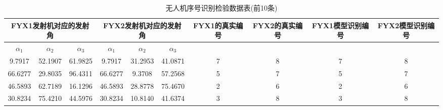 \documentclass[withoutpreface,bwprint]{cumcmthesis}
\begin{document}
	\begin{table}[htbp!]
		\footnotesize
		\caption{无人机序号识别检验数据表(前10条)}
		\centering
		\tabcolsep=0.1cm
		\begin{tabular}{@{}cccccccccc@{}}
			\toprule
			\multicolumn{3}{c}{\textbf{FYX1发射机对应的发射角}}                                                           & \multicolumn{3}{c}{\textbf{FYX2发射机对应的发射角}}                                                           & \textbf{FYX1的真实编号} & \textbf{FYX2的真实编号} & \textbf{FYX1模型识别编号} & \textbf{FYX2模型识别编号} \\ \midrule
			\multicolumn{1}{c|}{\textbf{$\alpha_{1}$}} & \multicolumn{1}{c|}{\textbf{$\alpha_{2}$}} & \multicolumn{1}{c|}{\textbf{$\alpha_{3}$}} & \multicolumn{1}{c|}{\textbf{$\alpha_{1}$}} & \multicolumn{1}{c|}{\textbf{$\alpha_{2}$}} & \multicolumn{1}{c|}{\textbf{$\alpha_{3}$}} & \multicolumn{4}{c}{\textbf{}}                                                                 \\ \midrule
			9.7917                           & 52.1907                          & 61.9825                          & 9.7917                           & 31.2953                          & 41.0871                          & 7                    & 8                    & 7                      & 8                      \\
			66.6277                          & 29.8035                          & 96.4311                          & 66.6277                          & 9.3708                           & 57.2568                          & 5                    & 7                    & 5                      & 7                      \\
			46.5893                          & 62.7189                          & 16.1296                          & 46.5893                          & 28.8778                          & 75.4670                          & 2                    & 6                    & 2                      & 6                      \\
			30.8234                          & 75.4210                          & 44.5976                          & 30.8234                          & 10.8140                          & 41.6374                          & 3                    & 8                    & 3                      & 8                      \\

\end{tabular}
\end{table}
\end{document}
